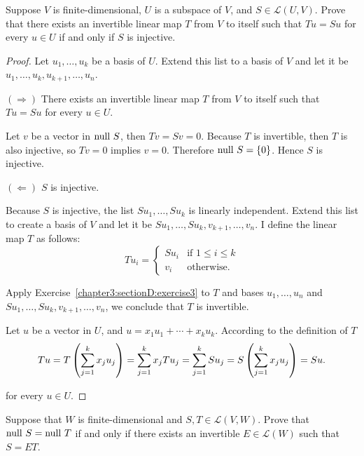 \begin{exercise}
    Suppose $V$ is finite-dimensional, $U$ is a subspace of $V$, and $S \in \mathcal{L}(U, V)$. Prove that there exists an invertible linear map $T$ from $V$ to itself such that $Tu = Su$ for every $u\in U$ if and only if $S$ is injective.
\end{exercise}

\begin{proof}
    Let $u_{1}, \ldots, u_{k}$ be a basis of $U$. Extend this list to a basis of $V$ and let it be $u_{1}, \ldots, u_{k}, u_{k+1}, \ldots, u_{n}$.

    $(\Rightarrow)$ There exists an invertible linear map $T$ from $V$ to itself such that $Tu = Su$ for every $u\in U$.

    Let $v$ be a vector in $\operatorname{null}\,{S}$, then $Tv = Sv = 0$. Because $T$ is invertible, then $T$ is also injective, so $Tv = 0$ implies $v = 0$. Therefore $\operatorname{null}\,{S} = \{0\}$. Hence $S$ is injective.

    $(\Leftarrow)$ $S$ is injective.

    Because $S$ is injective, the list $Su_{1}, \ldots, Su_{k}$ is linearly independent. Extend this list to create a basis of $V$ and let it be $Su_{1}, \ldots, Su_{k}, v_{k+1}, \ldots, v_{n}$. I define the linear map $T$ as follows:
    \[
        Tu_{i} = \begin{cases}
            Su_{i} & \text{if $1\leq i\leq k$} \\
            v_{i}  & \text{otherwise}.
        \end{cases}
    \]

    Apply Exercise~\ref{chapter3:sectionD:exercise3} to $T$ and bases $u_{1}, \ldots, u_{n}$ and $Su_{1}, \ldots, Su_{k}, v_{k+1}, \ldots, v_{n}$, we conclude that $T$ is invertible.

    Let $u$ be a vector in $U$, and $u = x_{1}u_{1} + \cdots + x_{k}u_{k}$. According to the definition of $T$
    \[
        Tu = T\left(\sum^{k}_{j=1}x_{j}u_{j}\right) = \sum^{k}_{j=1}x_{j}Tu_{j} = \sum^{k}_{j=1}Su_{j} = S\left(\sum^{k}_{j=1}x_{j}u_{j}\right) = Su.\qedhere
    \]

    for every $u\in U$.
\end{proof}
\newpage

\begin{exercise}
    Suppose that $W$ is finite-dimensional and $S, T \in \mathcal{L}(V, W)$. Prove that $\operatorname{null}\,{S} = \operatorname{null}\,{T}$ if and only if there exists an invertible $E \in \mathcal{L}(W)$ such that $S = ET$.
\end{exercise}

